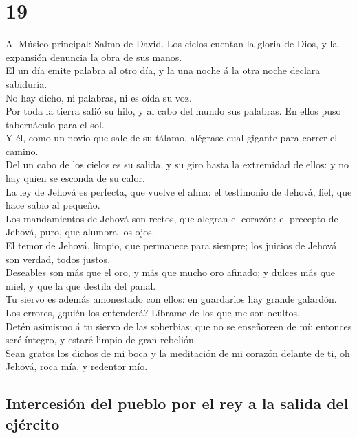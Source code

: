 \hypertarget{section-18}{%
\section{19}\label{section-18}}

 Al Músico principal: Salmo de David. Los cielos cuentan
la gloria de Dios, y la expansión denuncia la obra de sus manos.\\
 El un día emite palabra al otro día, y la una noche á la
otra noche declara sabiduría.\\
 No hay dicho, ni palabras, ni es oída su voz.\\
 Por toda la tierra salió su hilo, y al cabo del mundo sus
palabras. En ellos puso tabernáculo para el sol.\\
 Y él, como un novio que sale de su tálamo, alégrase cual
gigante para correr el camino.\\
 Del un cabo de los cielos es su salida, y su giro hasta
la extremidad de ellos: y no hay quien se esconda de su calor.\\
 La ley de Jehová es perfecta, que vuelve el alma: el
testimonio de Jehová, fiel, que hace sabio al pequeño.\\
 Los mandamientos de Jehová son rectos, que alegran el
corazón: el precepto de Jehová, puro, que alumbra los ojos.\\
 El temor de Jehová, limpio, que permanece para siempre;
los juicios de Jehová son verdad, todos justos.\\
 Deseables son más que el oro, y más que mucho oro
afinado; y dulces más que miel, y que la que destila del panal.\\
 Tu siervo es además amonestado con ellos: en guardarlos
hay grande galardón.\\
 Los errores, ¿quién los entenderá? Líbrame de los que me
son ocultos.\\
 Detén asimismo á tu siervo de las soberbias; que no se
enseñoreen de mí: entonces seré íntegro, y estaré limpio de gran
rebelión.\\
 Sean gratos los dichos de mi boca y la meditación de mi
corazón delante de ti, oh Jehová, roca mía, y redentor mío.

\hypertarget{intercesiuxf3n-del-pueblo-por-el-rey-a-la-salida-del-ejuxe9rcito}{%
\subsection{Intercesión del pueblo por el rey a la salida del
ejército}\label{intercesiuxf3n-del-pueblo-por-el-rey-a-la-salida-del-ejuxe9rcito}}

